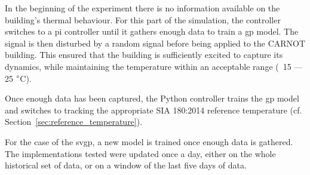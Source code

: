 In the beginning of the experiment there is no information available on the
building's thermal behaviour. For this part of the simulation, the controller
switches to a \acrshort{pi} controller until it gathers enough data to train a
\acrshort{gp} model. The signal is then disturbed by a random signal before
being applied to the CARNOT building. This ensured that the building is
sufficiently excited to capture its dynamics, while maintaining the
temperature within an acceptable range (~15 --- 25 $\degree$C).

Once enough data has been captured, the Python controller trains the
\acrshort{gp} model and switches to tracking the appropriate SIA 180:2014
reference temperature (cf. Section~\ref{sec:reference_temperature}).

For the case of the \acrshort{svgp}, a new model is trained once enough data is
gathered. The implementations tested were updated once a day, either on the
whole historical set of data, or on a window of the last five days of data.

\clearpage
